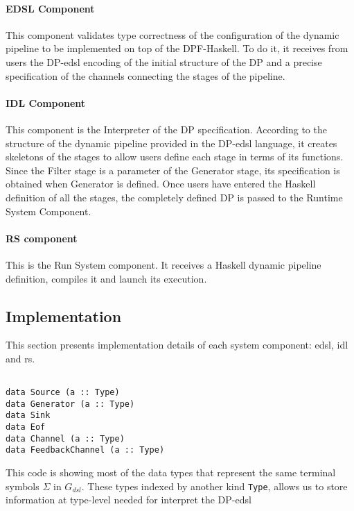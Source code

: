 \paragraph{EDSL Component} This component validates type correctness of the configuration of  the dynamic pipeline to be implemented on top of the  DPF-Haskell.  To do it, it receives from users the DP-\acrshort{edsl} encoding of the initial structure of the DP and a precise specification of the channels connecting the stages of the pipeline. 
%
\paragraph{IDL Component} This component is the Interpreter of the DP specification. According to the structure of the dynamic pipeline provided in the DP-\acrshort{edsl} language, it creates skeletons of the  stages to allow users define each stage in terms of its functions.  Since the Filter stage
is a parameter of the Generator stage, its specification is obtained when Generator is defined. Once users have entered  the Haskell definition of all the stages, the completely defined DP is passed to the Runtime System Component.
%
\paragraph{RS component} This is the Run System component. It receives a Haskell dynamic pipeline definition, compiles it and launch its execution. 
%
\subsection{Implementation}
This section presents 
implementation details of each system component: \acrshort{edsl}, \acrshort{idl} and \acrshort{rs}. 

\begin{listing}[H]
  \begin{verbatim}

data Source (a :: Type)
data Generator (a :: Type)
data Sink
data Eof
data Channel (a :: Type)
data FeedbackChannel (a :: Type)

  \end{verbatim}
  \caption[{[\texttt{Flow.hs}] $\Sigma$ enconding of $G_{dsl}$}]{This code is showing most of the data types that represent the same terminal symbols $\Sigma$ in $G_{dsl}$. These types indexed by another kind \texttt{Type}, allows us to store information at type-level needed for interpret the DP-\acrshort{edsl}}
  \label{src:dpfh:1}
\end{listing}
  

